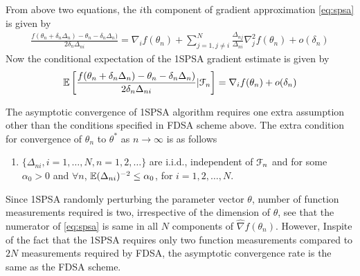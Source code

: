 From above two equations, the $i$th component of gradient approximation \eqref{eq:spsa} is given by
\begin{align}\label{eq:spsaexp}
\frac{f(\theta_n + \delta_n \Delta_n) - \theta_n - \delta_n \Delta_n)}{2\delta_n \Delta_{ni}} = \nabla_i f(\theta_n) + \sum\limits_{j=1, j \neq i}^N \frac{\Delta_{nj} }{\Delta_{ni}}  \nabla^2_{j} f(\theta_n)  + o(\delta_n)
\end{align}
Now the conditional expectation of the 1SPSA gradient estimate is given by 
\begin{align}\label{eq:spsacondmean}
\mathbb{E}\left[\frac{f(\theta_n + \delta_n \Delta_n) - \theta_n - \delta_n \Delta_n)}{2\delta_n \Delta_{ni}} | \mathcal{F}_n \right] = \nabla_i f(\theta_n) + o(\delta_n)
\end{align}

The asymptotic convergence of 1SPSA algorithm requires one extra assumption other than the conditions specified in FDSA scheme above. The extra condition for convergence of $\theta_n$ to $\theta^*$ as $n \to \infty$ is as follows
\begin{enumerate}[label=(\textbf{A\arabic*}),resume]
\item $\{\Delta_{ni}, i=1,\ldots,N, n=1,2,\ldots\}$ are i.i.d., independent of $\mathcal{F}_n$ and for some $\alpha_0 > 0$ and $\forall n$, $\mathbb{E} (\Delta_{ni})^{-2} \le \alpha_0$, for $i = 1,2,\ldots,N$.
\end{enumerate}
Since 1SPSA randomly perturbing the parameter vector $\theta$, number of function measurements required is two, irrespective of the dimension of $\theta$, see that the numerator of \eqref{eq:spsa} is same in all $N$ components of $\widehat{\nabla} f(\theta_{n})$. However, Inspite of the fact that the 1SPSA requires only two function measurements compared to  $2N$  measurements required by FDSA, the asymptotic convergence rate is the same as the FDSA scheme.
